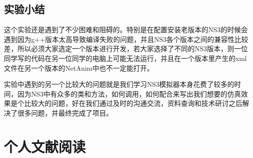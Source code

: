 \documentclass[lang=cn,11pt,a4paper,cite=authoryear]{elegantpaper}
\begin{document}
\subsection{实验小结}

这个实验还是遇到了不少困难和阻碍的。特别是在配置安装老版本的NS3的时候会遇到因为g++版本太高导致编译失败的问题，并且NS3各个版本之间的兼容性比较差，所以必须大家选定一个版本进行开发，若大家选择了不同的NS3版本，则一位同学写的代码在另一位同学的电脑上可能无法运行，并且在一个版本里产生的xml文件在另一个版本的NetAnim中也不一定能打开。

实验中遇到的另一个比较大的问题就是我们学习NS3模拟器本身花费了较多的时间，因为NS3中有众多的类和方法，如何调用，如何配合来写出我们想要的仿真效果是个比较大的问题，好在我们通过及时的沟通交流，资料查询和技术研讨之后解决了很多问题，并最终完成了项目。

\section{个人文献阅读}
\end{document}
